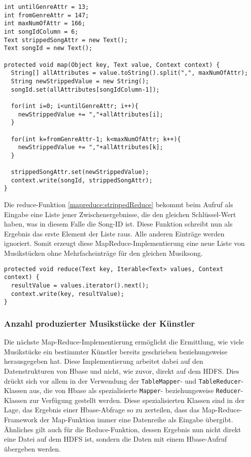 
\begin{lstlisting}[caption={Map-Funktion zur Entfernung von mehrfachen Musikeinträgen}, label=mapreduce:strippedMap]
int untilGenreAttr = 13;
int fromGenreAttr = 147;
int maxNumOfAttr = 166;
int songIdColumn = 6;
Text strippedSongAttr = new Text();
Text songId = new Text();

protected void map(Object key, Text value, Context context) {
  String[] allAttributes = value.toString().split(",", maxNumOfAttr);
  String newStrippedValue = new String();
  songId.set(allAttributes[songIdColumn-1]);
      
  for(int i=0; i<untilGenreAttr; i++){
    newStrippedValue += ","+allAttributes[i];
  }
      
  for(int k=fromGenreAttr-1; k<maxNumOfAttr; k++){
    newStrippedValue += ","+allAttributes[k];
  }
      
  strippedSongAttr.set(newStrippedValue);
  context.write(songId, strippedSongAttr);
}
\end{lstlisting}

Die reduce-Funktion \ref{mapreduce:strippedReduce} bekommt beim Aufruf als Eingabe eine Liste jener Zwischenergebnisse, die den gleichen 
Schlüssel-Wert haben, was in diesem Falle die Song-ID ist. 
Diese Funktion schreibt nun als Ergebnis das erste Element der Liste raus. Alle anderen
Einträge werden ignoriert. Somit erzeugt diese MapReduce-Implementierung eine neue Liste
von Musikstücken ohne Mehrfacheinträge für den gleichen Musiksong.

\begin{lstlisting}[caption={Reduce-Funktion zur Entfernung von mehrfachen Musikeinträgen}, label=mapreduce:strippedReduce]
protected void reduce(Text key, Iterable<Text> values, Context context) {
  resultValue = values.iterator().next();
  context.write(key, resultValue);
}
\end{lstlisting}


\subsubsection{Anzahl produzierter Musikstücke der Künstler}
\label{mapred:sec:anzahlSongs}
Die nächste Map-Reduce-Implementierung ermöglicht die Ermittlung, wie viele 
Musikstücke ein bestimmter Künstler bereits geschrieben beziehungsweise herausgegeben
hat. Diese Implementierung arbeitet dabei auf den Datenstrukturen von Hbase und nicht,
wie zuvor, direkt auf dem HDFS. Dies drückt sich vor allem in der Verwendung der 
\texttt{TableMapper}- und \texttt{TableReducer}-Klassen aus, die von Hbase als spezialisierte \texttt{Mapper}- beziehungsweise \texttt{Reducer}-Klassen zur Verfügung gestellt werden.
Diese spezialisierten Klassen sind in der Lage, das Ergebnis einer Hbase-Abfrage so zu
zerteilen, dass das Map-Reduce-Framework der Map-Funktion immer eine Datenreihe 
als Eingabe übergibt. Ähnliches gilt auch für die Reduce-Funktion, dessen Ergebnis
nun nicht direkt eine Datei auf dem HDFS ist, sondern die Daten mit einem Hbase-Aufruf übergeben
werden.

